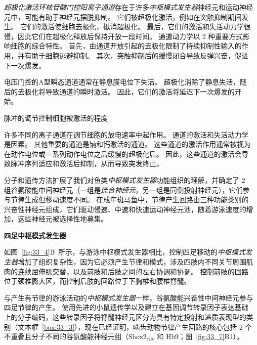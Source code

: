\begin{proposition}[神经元离子通道有助于中枢模式发生器功能]
	\quad \quad \textit{超极化激活环核苷酸门控阳离子通道}存在于许多\textit{中枢模式发生器}神经元和运动神经元中，可能有助于神经元摆脱抑制。
	它们被超极化激活，例如在突触抑制期间发生。
	它们的激活使细胞去极化，抵消超极化。
	最后，它们的激活和失活动力学很慢，因此它们在超极化释放后保持开放一段时间。
	通道动力学以 2 种重要方式影响细胞的综合特性。
	首先，由通道开放引起的去极化限制了持续抑制性输入的作用，并有助于细胞逃避抑制。
	其次，突触抑制后的缓慢闭合导致反弹兴奋，促进下一次爆发。
	
	\quad \quad 电压门控的A型瞬态通道通常在静息膜电位下失活。
	超极化消除了静息失活，随后的去极化将导致通道的瞬时激活。
	因此，它们的激活将延迟下一次爆发的开始。
	
	\quad \quad 脉冲的调节控制细胞被激活的程度
	
	\quad \quad 许多不同的离子通道在调节细胞的放电速率中起作用。
	通道的激活和失活动力学是因素。
	其他重要的通道是钠和钙激活的通道。
	这些通道的激活作用通常被视为在动作电位或一系列动作电位之后缓慢的超极化后。
	因此，这些通道的激活会导致脉冲序列适应和激活后抑制，从而导致突发终止。
	
\end{proposition}


分子和遗传方法扩展了我们对鱼类\textit{中枢模式发生器}功能组织的理解，并确定了 2 组谷氨酸能中间神经元（一组是\textit{连合神经元}，另一组是同侧投射神经元），它们参与节律生成但移动速度不同。
在成年斑马鱼中，节律产生回路由三种功能类别的兴奋性神经元组成，它们驱动慢速、中速和快速运动神经元池，随着游泳速度的增加，这些神经元被选择性地募集。


\textbf{四足中枢模式发生器}

如图~\ref{fig:33_4}B~所示，与游泳中枢模式发生器相比，控制四足移动的\textit{中枢模式发生器}增加了组织复杂性，因为它必须产生节律和模式，涉及四肢内不同关节周围肌肉的连续屈伸肌交替，以及前肢和后肢之间的左右协调和协调。
控制前肢的回路位于颈椎膨大区，而控制后肢的回路位于下胸椎和腰椎脊髓。


与产生有节律的游泳活动的\textit{中枢模式发生器}一样，谷氨酸能兴奋性中间神经元参与四足节律的产生。
使用先进的小鼠遗传学以及建立在基因调节转录因子表达基础上的分子编码，这些转录因子将脊髓神经元区分为具有特定投射和递质表现型的类别（文本框~\ref{box:33_3}），现在已经证明，啮齿动物节律产生回路的核心包括 2 个不重叠且分子不同的谷氨酸能神经元组（Shox2$_{ON} $ 和 Hb9；图~\ref{fig:33_7}B1）。



